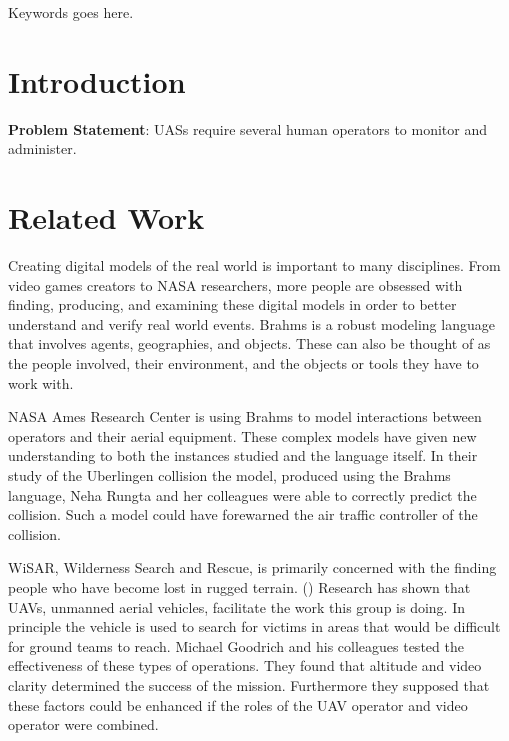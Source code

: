 \documentclass[conference,letterpaper]{IEEEtran}
\begin{document}
\begin{IEEEkeywords}
Keywords goes here.
\end{IEEEkeywords}


%
\IEEEpeerreviewmaketitle


\section{Introduction}

\noindent\textbf{Problem Statement}: UASs require several human operators to monitor and administer.

\section{Related Work}

\par\noindent Creating digital models of the real world is important to
many disciplines. From video games creators to NASA researchers, more people are
obsessed with finding, producing, and examining these digital models in order 
to better understand and verify real world events. Brahms is a robust
modeling language that involves agents, geographies, and objects. These can also
be thought of as the people involved, their environment, and the objects or
tools they have to work with.
\par\noindent NASA Ames Research Center is using Brahms to model interactions
between operators and their aerial equipment. These complex models have given
new understanding to both the instances studied and the language itself. In
their study of the Uberlingen collision the model, produced using the Brahms
language, Neha Rungta and her colleagues were able to correctly predict the
collision. Such a model could have forewarned the air traffic controller of the
collision.
\par\noindent WiSAR, Wilderness Search and Rescue, is primarily concerned with
the finding people who have become lost in rugged terrain. () Research has shown
that UAVs, unmanned aerial vehicles, facilitate the work this group is doing. In
principle the vehicle is used to search for victims in areas that would be
difficult for ground teams to reach. Michael Goodrich and his colleagues tested
the effectiveness of these types of operations. They found that altitude and
video clarity determined the success of the mission. Furthermore they supposed
that these factors could be enhanced if the roles of the UAV operator and video
operator were combined.
\end{document}
